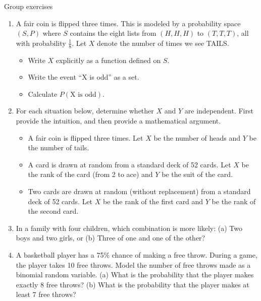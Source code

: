 \documentclass[10pt]{beamer}
\begin{document}
\begin{frame}{Group exercises}

\begin{enumerate}
	\item \footnotesize A fair coin is flipped three times. This is modeled by a probability space $(S,P)$ where $S$ contains the eight lists from $(H,H,H)$ to $(T,T,T)$, all with probability $\frac{1}{8}$.  Let $X$ denote the number of times we see TAILS.
	\begin{itemize}  \scriptsize  
	\item[a.] Write $X$ explicitly as a function defined on $S$.
	\item[b.] Write the event \enquote{X is odd} as a set.
	\item[c.] Calculate $P(\text{X is odd})$.
	\end{itemize}
	\item \footnotesize For each situation below, determine whether $X$ and $Y$ are independent. First provide the intuition, and then provide a mathematical argument. 
	\begin{itemize}  \scriptsize 
	\item[a.] A fair coin is flipped three times. Let $X$ be the number of heads and $Y$ be the number of tails. 
	\item[b.] A card is drawn at random from a standard deck of 52 cards. Let $X$ be the rank of the card (from 2 to ace) and $Y$ be the suit of the card.
	\item[c.] Two cards are drawn at random (without replacement) from a standard deck of 52 cards. Let $X$ be the rank of the first card and $Y$ be the rank of the second card.
	\end{itemize} 
	\item \footnotesize In a family with four children, which combination is more likely: (a) Two boys and two girls, or (b) Three of one and one of the other?
	\item \footnotesize
	A basketball player has a 75\% chance of making a free throw. During a game, the player takes 10 free throws. Model the number of free throws made as a binomial random variable. (a) What is the probability that the player makes exactly 8 free throws? (b) What is the probability that the player makes at least 7 free throws?
\end{enumerate}

\end{frame}
\end{document}
